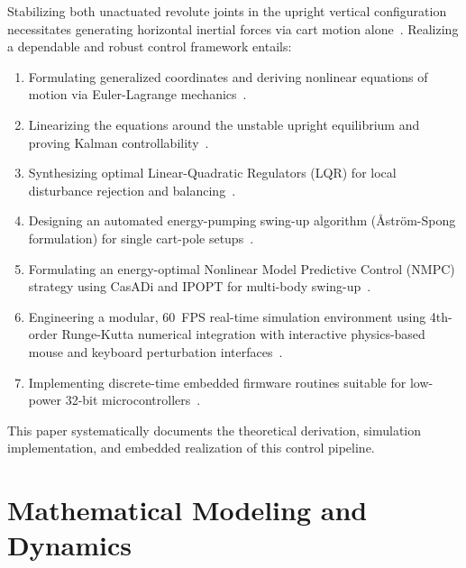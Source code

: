 \documentclass[conference]{IEEEtran}
\begin{document}
Stabilizing both unactuated revolute joints in the upright vertical configuration necessitates generating horizontal inertial forces via cart motion alone~\cite{ref_task, ref_git}. Realizing a dependable and robust control framework entails:
\begin{enumerate}
    \item Formulating generalized coordinates and deriving nonlinear equations of motion via Euler-Lagrange mechanics~\cite{ref_task, ref_brunton}.
    \item Linearizing the equations around the unstable upright equilibrium and proving Kalman controllability~\cite{ref_task, ref_git}.
    \item Synthesizing optimal Linear-Quadratic Regulators (LQR) for local disturbance rejection and balancing~\cite{ref_brunton}.
    \item Designing an automated energy-pumping swing-up algorithm (Åström-Spong formulation) for single cart-pole setups~\cite{ref_astrom, ref_spong}.
    \item Formulating an energy-optimal Nonlinear Model Predictive Control (NMPC) strategy using CasADi and IPOPT for multi-body swing-up~\cite{ref_casadi, ref_git}.
    \item Engineering a modular, 60~FPS real-time simulation environment using 4th-order Runge-Kutta numerical integration with interactive physics-based mouse and keyboard perturbation interfaces~\cite{ref_git}.
    \item Implementing discrete-time embedded firmware routines suitable for low-power 32-bit microcontrollers~\cite{ref_git, ref_den}.
\end{enumerate}

This paper systematically documents the theoretical derivation, simulation implementation, and embedded realization of this control pipeline.

\section{Mathematical Modeling and Dynamics}
\end{document}
